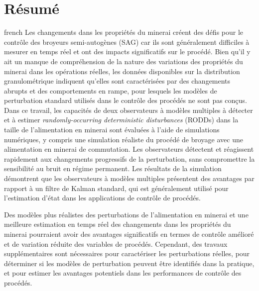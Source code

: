 \chapter*{Résumé}               %
\label{chap-resume}             %

\begin{otherlanguage*}{french}
Les changements dans les propriétés du minerai créent des défis pour le contrôle des broyeurs semi-autogènes (SAG) car ils sont généralement difficiles à mesurer en temps réel et ont des impacts significatifs sur le procédé. Bien qu'il y ait un manque de compréhension de la nature des variations des propriétés du minerai dans les opérations réelles, les données disponibles sur la distribution granulométrique indiquent qu'elles sont caractérisées par des changements abrupts et des comportements en rampe, pour lesquels les modèles de perturbation standard utilisés dans le contrôle des procédés ne sont pas conçus. Dans ce travail, les capacités de deux observateurs à modèles multiples à détecter et à estimer \textit{randomly-occurring deterministic disturbances} (\gls{RODD}s) dans la taille de l'alimentation en minerai sont évaluées à l'aide de simulations numériques, y compris une simulation réaliste du procédé de broyage avec une alimentation en minerai de commutation. Les observateurs détectent et réagissent rapidement aux changements progressifs de la perturbation, sans compromettre la sensibilité au bruit en régime permanent. Les résultats de la simulation démontrent que les observateurs à modèles multiples présentent des avantages par rapport à un filtre de Kalman standard, qui est généralement utilisé pour l'estimation d'état dans les applications de contrôle de procédés.

Des modèles plus réalistes des perturbations de l'alimentation en minerai et une meilleure estimation en temps réel des changements dans les propriétés du minerai pourraient avoir des avantages significatifs en termes de contrôle amélioré et de variation réduite des variables de procédés. Cependant, des travaux supplémentaires sont nécessaires pour caractériser les perturbations réelles, pour déterminer si les modèles de perturbation peuvent être identifiés dans la pratique, et pour estimer les avantages potentiels dans les performances de contrôle des procédés.
\end{otherlanguage*}

